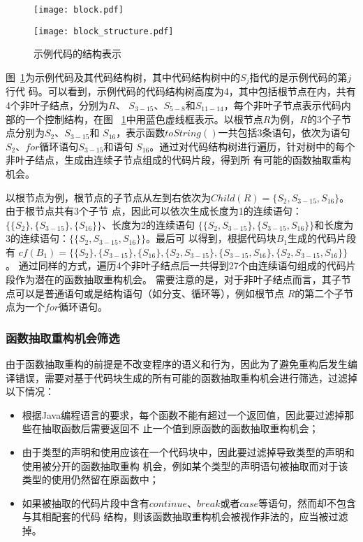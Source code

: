 \begin{figure} 
  \centering 
  \begin{minipage}[c]{0.5\textwidth} 
    \centering 
    \texttt{[image: block.pdf]} 
  \end{minipage}%
  \begin{minipage}[r]{0.5\textwidth} 
    \centering 
    \texttt{[image: block\_structure.pdf]} 
  \end{minipage} 
\caption{示例代码的结构表示}
\label{block-example}
\end{figure}

图~\ref{block-example}为示例代码及其代码结构树，其中代码结构树中的$S_j$指代的是示例代码的第$j$行代
码。可以看到，示例代码的代码结构树高度为4，其中包括根节点在内，共有4个非叶子结点，分别为$R$、
$S_{3-15}$、$S_{5-8}$和$S_{11-14}$，每个非叶子节点表示代码内部的一个控制结构，在图
~\ref{block-example}中用蓝色虚线框表示。以根节点$R$为例，$R$的3个子节点分别为$S_2$、$S_{3-15}$和
$S_{16}$，表示函数$toString()$一共包括3条语句，依次为语句$S_2$、$for$循环语句$S_{3-15}$和语句
$S_{16}$。通过对代码结构树进行遍历，针对树中的每个非叶子结点，生成由连续子节点组成的代码片段，得到所
有可能的函数抽取重构机会。

以根节点为例，根节点的子节点从左到右依次为$Child(R)=\{S_2,S_{3-15},S_{16}\}$。由于根节点共有3个子节
点，因此可以依次生成长度为1的连续语句：$\{\{S_2\},\{S_{3-15}\},\{S_{16}\}\}$、长度为2的连续语句
$\{\{S_2,S_{3-15}\},\{S_{3-15},S_{16}\}\}$和长度为3的连续语句：$\{\{S_2,S_{3-15},S_{16}\}\}$。最后可
以得到，根据代码块$B_1$生成的代码片段有
$cf(B_1)=\{\{S_2\},\{S_{3-15}\},\{S_{16}\},\{S_2,S_{3-15}\},\{S_{3-15},S_{16}\},\{S_2,S_{3-15},S_{16}\}\}$。
通过同样的方式，遍历4个非叶子结点后一共得到27个由连续语句组成的代码片段作为潜在的函数抽取重构机会。
需要注意的是，对于非叶子结点而言，其子节点可以是普通语句或是结构语句（如分支、循环等），例如根节点
$R$的第二个子节点为一个$for$循环语句。

\subsubsection{函数抽取重构机会筛选}
由于函数抽取重构的前提是不改变程序的语义和行为，因此为了避免重构后发生编译错误，需要对基于代码块生成的所有可能的函数抽取重构机会进行筛选，过滤掉以下情况：
\begin{itemize}
  \item 根据Java编程语言的要求，每个函数不能有超过一个返回值，因此要过滤掉那些在抽取函数后需要返回不
  止一个值到原函数的函数抽取重构机会；
  \item 由于类型的声明和使用应该在一个代码块中，因此要过滤掉导致类型的声明和使用被分开的函数抽取重构
  机会，例如某个类型的声明语句被抽取而对于该类型的使用仍然留在原函数中；
  \item 如果被抽取的代码片段中含有$continue$、$break$或者$case$等语句，然而却不包含与其相配套的代码
  结构，则该函数抽取重构机会被视作非法的，应当被过滤掉。
\end{itemize}

